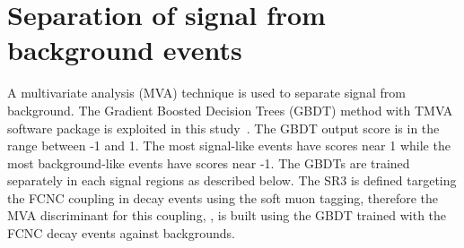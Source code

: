 %
%


\clearpage
\section{Separation of signal from background events}
\label{sec:separation}
A multivariate analysis (MVA) technique is used to separate signal from background. 
The Gradient Boosted Decision Trees (GBDT) method with TMVA software package 
is exploited in this study~\cite{BDTG,TMVA}. The GBDT output score is in the range between -1 and 1.
The most signal-like events have scores near 1 while the most background-like events have scores near -1. The GBDTs are trained separately in each signal regions as described below.
The SR3 is defined targeting the FCNC \tZc coupling in \ttbar decay events
using the soft muon tagging, therefore the MVA discriminant for this coupling, \Dthree,  is built using the GBDT trained with the FCNC \tZc \ttbar decay events against backgrounds.

